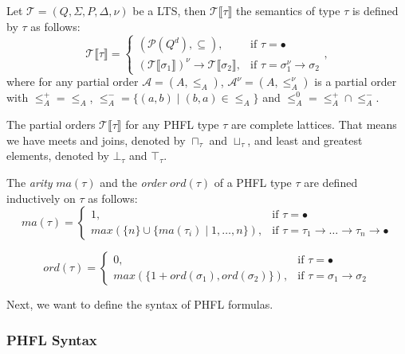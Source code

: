\begin{definition}
    Let $\mathcal{T} = (Q, \Sigma, P, \Delta, \nu)$ be a LTS, then $\mathcal{T}\llbracket\tau\rrbracket$ the semantics
    of type $\tau$ is defined by $\tau$ as follows:
        \[\mathcal{T}\llbracket\tau\rrbracket=
        \begin{cases}
            (\mathscr{P}(Q^d), \subseteq),  & \text{if }\tau = \bullet\\
            (\mathcal{T}\llbracket\sigma_1\rrbracket)^\nu \rightarrow \mathcal{T}\llbracket\sigma_2\rrbracket, &
            \text{if }\tau = \sigma_1^\nu\rightarrow \sigma_2
        \end{cases},\]
    where for any partial order $\mathcal{A} = (A, \leq_A)$, $\mathcal{A}^\nu = (A, \leq_A^\nu)$ is a partial order
    with $\leq_A^+ = \leq_A$, $\leq_A^- = \{(a, b) \mid (b, a) \in \leq_A\}$ and $\leq_A^0 = \leq_A^+ \cap \leq_A^-$.
\end{definition}

The partial orders $\mathcal{T}\llbracket\tau\rrbracket$ for any PHFL type $\tau$ are complete lattices. That means we
have meets and joins, denoted by $\sqcap_\tau$ and $\sqcup_\tau$, and least and greatest elements, denoted by
$\bot_\tau$ and $\top_\tau$.

\begin{definition}
    The \emph{arity} $ma(\tau)$ and the \emph{order} $ord(\tau)$ of a PHFL type $\tau$ are defined inductively on
    $\tau$ as
follows:
\[ma(\tau)=
\begin{cases}
    1, & \text{if }\tau = \bullet\\
    max(\{n\} \cup \{ma(\tau_i)\mid1,\dots,n\}), &
    \text{if }\tau = \tau_1\rightarrow\dots\rightarrow\tau_n\rightarrow\bullet
\end{cases}\]

\[ord(\tau)=
\begin{cases}
    0, & \text{if }\tau = \bullet\\
    max(\{1 + ord(\sigma_1), ord(\sigma_2)\}), & \text{if }\tau = \sigma_1 \rightarrow \sigma_2
\end{cases}\]
\end{definition}

Next, we want to define the syntax of PHFL formulas.

\subsubsection{PHFL Syntax}

